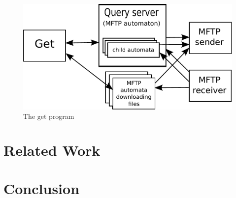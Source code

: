 \documentclass[letterpaper]{article}
\begin{document}
\begin{figure}
  \center
  \includegraphics[scale=0.65]{get_diagram}
  \caption{The get program \label{EvalutationTwo}}
\end{figure}

\section{Related Work}

\section{Conclusion}
\end{document}

